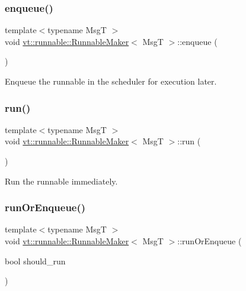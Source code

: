 \subsubsection{\texorpdfstring{enqueue()}{enqueue()}}
{\footnotesize\ttfamily template$<$typename MsgT $>$ \\
void \hyperlink{structvt_1_1runnable_1_1_runnable_maker}{vt\+::runnable\+::\+Runnable\+Maker}$<$ MsgT $>$\+::enqueue (\begin{DoxyParamCaption}{ }\end{DoxyParamCaption})}



Enqueue the runnable in the scheduler for execution later. 

\mbox{\label{structvt_1_1runnable_1_1_runnable_maker_a8fb3e1362dd6f746e991786654f5bd40}} 
\subsubsection{\texorpdfstring{run()}{run()}}
{\footnotesize\ttfamily template$<$typename MsgT $>$ \\
void \hyperlink{structvt_1_1runnable_1_1_runnable_maker}{vt\+::runnable\+::\+Runnable\+Maker}$<$ MsgT $>$\+::run (\begin{DoxyParamCaption}{ }\end{DoxyParamCaption})\hspace{0.3cm}{\ttfamily [inline]}}



Run the runnable immediately. 

\mbox{\label{structvt_1_1runnable_1_1_runnable_maker_aa0ae94d80e43385c18ee1e2afbce59a2}} 
\subsubsection{\texorpdfstring{run\+Or\+Enqueue()}{runOrEnqueue()}}
{\footnotesize\ttfamily template$<$typename MsgT $>$ \\
void \hyperlink{structvt_1_1runnable_1_1_runnable_maker}{vt\+::runnable\+::\+Runnable\+Maker}$<$ MsgT $>$\+::run\+Or\+Enqueue (\begin{DoxyParamCaption}\item[{bool}]{should\+\_\+run }\end{DoxyParamCaption})\hspace{0.3cm}{\ttfamily [inline]}}




